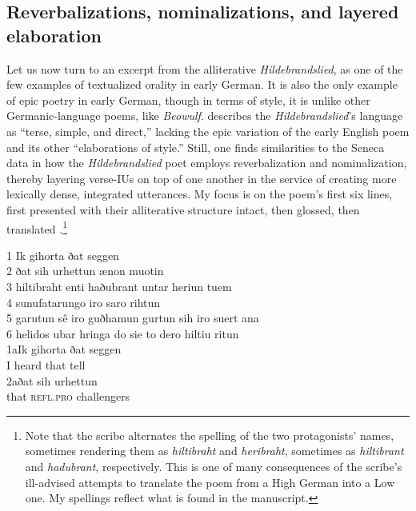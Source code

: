 \subsection{Reverbalizations, nominalizations, and layered elaboration}\label{sec:6.2.2}

Let us now turn to an excerpt from the alliterative \textit{Hildebrandslied}, as one of the few examples of textualized orality in early German. It is also the only example of epic poetry in early German, though in terms of style, it is unlike other Germanic-language poems, like \textit{Beowulf}. \citet[52]{Bostock1976} describes the \textit{Hildebrandslied}’s language as “terse, simple, and direct,” lacking the epic variation of the early English poem and its other “elaborations of style.” Still, one finds similarities to the Seneca data in how the \textit{Hildebrandslied} poet employs reverbalization and nominalization, thereby layering verse-IUs on top of one another in the service of creating more lexically dense, integrated utterances. My focus is on the poem’s first six lines, first presented with their alliterative structure intact, then glossed, then translated .\footnote{{Note that the scribe alternates the spelling of the two protagonists' names, sometimes rendering them as \textit{hiltibraht} and \textit{heribraht}, sometimes as \textit{hiltibrant} and \textit{hadubrant}, respectively. This is one of many consequences of the scribe's ill-advised attempts to translate the poem from a High German into a Low one. My spellings reflect what is found in the manuscript.}}

\TabPositions{0pt,2em}
\ea%
    \label{ex:6:17}
1 \tab Ik gihorta ðat seggen\\
2 \tab ðat sih urhettun \qquad ænon muotin\\
3 \tab hiltibraht enti haðubrant \qquad untar heriun tuem\\
4 \tab sunufatarungo \qquad iro saro rihtun\\
5 \tab garutun sê iro guðhamun \qquad gurtun sih iro suert ana\\
6 \tab helidos ubar hringa \qquad do sie to dero hiltiu ritun\\

1a\tab \gll Ik  gihorta  ðat  seggen\\
            I  heard   that  tell\\

2a\tab \gll ðat     sih       urhettun\\
           that   \textsc{refl.pro}   challengers\\

